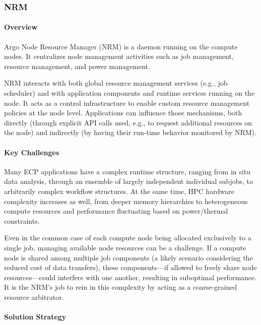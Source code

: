 \subsubsection*{NRM}

\paragraph{Overview}

Argo Node Resource Manager (NRM) is a daemon running on the compute
nodes. It centralizes node management activities such as job management,
resource management, and power management.

NRM interacts with both global resource management services (e.g., job
scheduler) and with application components and runtime services running on
the node. It acts as a control infrastructure to enable custom resource
management policies at the node level.  Applications can influence those
mechanisms, both directly (through explicit API calls used, e.g., to
request additional resources on the node) and indirectly (by having their
run-time behavior monitored by NRM).

\paragraph{Key Challenges}

Many ECP applications have a complex runtime structure, ranging from in
situ data analysis, through an ensemble of largely independent individual
subjobs, to arbitrarily complex workflow structures.  At the same time, HPC
hardware complexity increases as well, from deeper memory hierarchies to
heterogeneous compute resources and performance fluctuating based on
power/thermal constraints.

Even in the common case of each compute node being allocated exclusively to
a single job, managing available node resources can be a challenge.  If a
compute node is shared among multiple job components (a likely scenario
considering the reduced cost of data transfers), these components---if
allowed to freely share node resources---could interfere with one another,
resulting in suboptimal performance.  It is the NRM's job to rein in this
complexity by acting as a coarse-grained resource arbitrator.

\paragraph{Solution Strategy}


